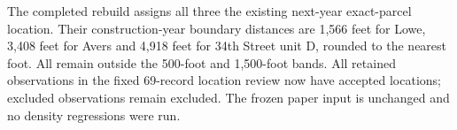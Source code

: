 The completed rebuild assigns all three the existing next-year exact-parcel location. Their construction-year boundary distances are 1,566 feet for Lowe, 3,408 feet for Avers and 4,918 feet for 34th Street unit D, rounded to the nearest foot. All remain outside the 500-foot and 1,500-foot bands. All retained observations in the fixed 69-record location review now have accepted locations; excluded observations remain excluded. The frozen paper input is unchanged and no density regressions were run.
